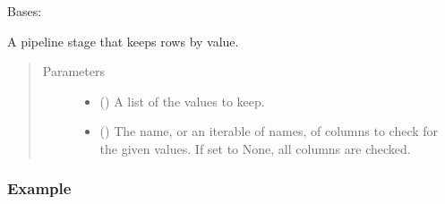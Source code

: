 \documentclass[letterpaper,10pt,english]{sphinxmanual}
\begin{document}

\begin{fulllineitems}
\label{\detokenize{dalio.pipe:dalio.pipe.ValKeep}}
Bases: 

A pipeline stage that keeps rows by value.
\begin{quote}\begin{description}
\item[{Parameters}] \leavevmode\begin{itemize}
\item {} 
 () \textendash{} A list of the values to keep.

\item {} 
 (\sphinxstyleliteralemphasis{\sphinxupquote{, }}) \textendash{} The name, or an iterable of names, of columns to check for the given
values. If set to None, all columns are checked.

\end{itemize}

\end{description}\end{quote}
\subsubsection*{Example}


\end{fulllineitems}
\end{document}
